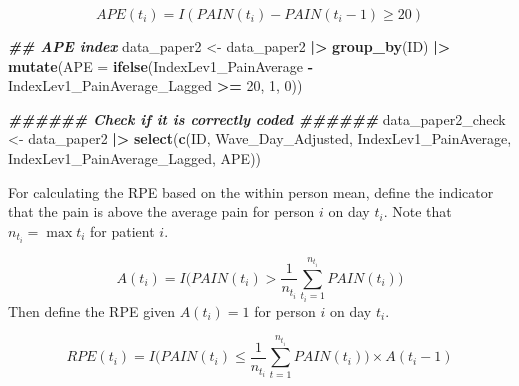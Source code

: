 \documentclass[
  12pt,
]{article}
\newenvironment{Shaded}{\begin{snugshade}}{\end{snugshade}}
\newcommand{\AttributeTok}[1]{\textcolor[rgb]{0.13,0.29,0.53}{#1}}
\newcommand{\DecValTok}[1]{\textcolor[rgb]{0.00,0.00,0.81}{#1}}
\newcommand{\DocumentationTok}[1]{\textcolor[rgb]{0.56,0.35,0.01}{\textbf{\textit{#1}}}}
\newcommand{\FunctionTok}[1]{\textcolor[rgb]{0.13,0.29,0.53}{\textbf{#1}}}
\newcommand{\NormalTok}[1]{#1}
\newcommand{\OtherTok}[1]{\textcolor[rgb]{0.56,0.35,0.01}{#1}}
\newcommand{\SpecialCharTok}[1]{\textcolor[rgb]{0.81,0.36,0.00}{\textbf{#1}}}
\begin{document}
\[
APE(t_i)=I(PAIN(t_i)-PAIN(t_i-1) \geq 20)
\]

\begin{Shaded}
\begin{Highlighting}[]
\DocumentationTok{\#\# APE index}
\NormalTok{data\_paper2 }\OtherTok{\textless{}{-}}\NormalTok{ data\_paper2 }\SpecialCharTok{|\textgreater{}}
  \FunctionTok{group\_by}\NormalTok{(ID) }\SpecialCharTok{|\textgreater{}}
  \FunctionTok{mutate}\NormalTok{(}\AttributeTok{APE =} \FunctionTok{ifelse}\NormalTok{(IndexLev1\_PainAverage }\SpecialCharTok{{-}}\NormalTok{ IndexLev1\_PainAverage\_Lagged }\SpecialCharTok{\textgreater{}=} \DecValTok{20}\NormalTok{, }\DecValTok{1}\NormalTok{, }\DecValTok{0}\NormalTok{))}

\DocumentationTok{\#\#\#\#\#\# Check if it is correctly coded \#\#\#\#\#\#}
\NormalTok{data\_paper2\_check }\OtherTok{\textless{}{-}}\NormalTok{ data\_paper2 }\SpecialCharTok{|\textgreater{}}
  \FunctionTok{select}\NormalTok{(}\FunctionTok{c}\NormalTok{(ID, Wave\_Day\_Adjusted, IndexLev1\_PainAverage, IndexLev1\_PainAverage\_Lagged, APE))}
\end{Highlighting}
\end{Shaded}

For calculating the RPE based on the within person mean, define the
indicator that the pain is above the average pain for person \(i\) on
day \(t_i\). Note that \(n_{t_i}=\max{t_i}\) for patient \(i\).

\[
A(t_i)=I\Big(PAIN(t_i)>\frac{1}{n_{t_i}}\sum_{t_i=1}^{n_{t_i}}PAIN(t_i)\Big)
\] Then define the RPE given \(A(t_i)=1\) for person \(i\) on day
\(t_i\).

\[
RPE(t_i)=I\Big(PAIN(t_i)\leq \frac{1}{n_{t_i}}\sum_{t=1}^{n_{t_i}}PAIN(t_i)\Big)\times A(t_i-1)
\]
\end{document}

